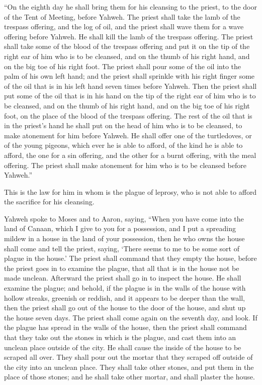  ``On the eighth day he shall bring them for his
cleansing to the priest, to the door of the Tent of Meeting, before
Yahweh.  The priest shall take the lamb of the trespass
offering, and the log of oil, and the priest shall wave them for a wave
offering before Yahweh.  He shall kill the lamb of the
trespass offering. The priest shall take some of the blood of the
trespass offering and put it on the tip of the right ear of him who is
to be cleansed, and on the thumb of his right hand, and on the big toe
of his right foot.  The priest shall pour some of the oil
into the palm of his own left hand;  and the priest shall
sprinkle with his right finger some of the oil that is in his left hand
seven times before Yahweh.  Then the priest shall put
some of the oil that is in his hand on the tip of the right ear of him
who is to be cleansed, and on the thumb of his right hand, and on the
big toe of his right foot, on the place of the blood of the trespass
offering.  The rest of the oil that is in the priest's
hand he shall put on the head of him who is to be cleansed, to make
atonement for him before Yahweh.  He shall offer one of
the turtledoves, or of the young pigeons, which ever he is able to
afford,  of the kind he is able to afford, the one for a
sin offering, and the other for a burnt offering, with the meal
offering. The priest shall make atonement for him who is to be cleansed
before Yahweh.''

 This is the law for him in whom is the plague of
leprosy, who is not able to afford the sacrifice for his cleansing.

 Yahweh spoke to Moses and to Aaron, saying,
 ``When you have come into the land of Canaan, which I
give to you for a possession, and I put a spreading mildew in a house in
the land of your possession,  then he who owns the house
shall come and tell the priest, saying, `There seems to me to be some
sort of plague in the house.'  The priest shall command
that they empty the house, before the priest goes in to examine the
plague, that all that is in the house not be made unclean. Afterward the
priest shall go in to inspect the house.  He shall
examine the plague; and behold, if the plague is in the walls of the
house with hollow streaks, greenish or reddish, and it appears to be
deeper than the wall,  then the priest shall go out of
the house to the door of the house, and shut up the house seven days.
 The priest shall come again on the seventh day, and
look. If the plague has spread in the walls of the house,
 then the priest shall command that they take out the
stones in which is the plague, and cast them into an unclean place
outside of the city.  He shall cause the inside of the
house to be scraped all over. They shall pour out the mortar that they
scraped off outside of the city into an unclean place. 
They shall take other stones, and put them in the place of those stones;
and he shall take other mortar, and shall plaster the house.

